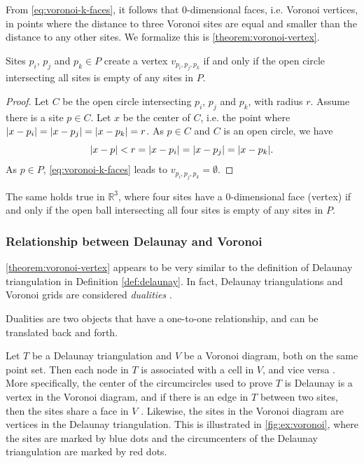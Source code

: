 From \autoref{eq:voronoi-k-faces}, it follows that 0-dimensional faces, i.e. Voronoi vertices, in points where the distance to three Voronoi sites are equal and smaller than the distance to any other sites. We formalize this is \autoref{theorem:voronoi-vertex}.

\begin{theorem}
\label{theorem:voronoi-vertex}
Sites $p_i$, $p_j$ and $p_k \in P$ create a vertex $v_{p_i, p_j, p_k}$ if and only if the open circle intersecting all sites is empty of any sites in $P$. 
\end{theorem}
\begin{proof}
Let $C$ be the open circle intersecting $p_i$, $p_j$ and $p_k$, with radius $r$. Assume there is a site $p \in C$. Let $x$ be the center of $C$, i.e. the point where $\lvert x - p_i\rvert = \lvert x - p_j\rvert = \lvert x - p_k\rvert = r$. As $p \in C$ and $C$ is an open circle, we have
\begin{equation*}
    \lvert x - p\rvert < r = \lvert x - p_i\rvert = \lvert x - p_j\rvert = \lvert x - p_k\rvert.
\end{equation*}
As $p \in P$, \autoref{eq:voronoi-k-faces} leads to $v_{p_i, p_j, p_k} = \emptyset$.
\end{proof}
The same holds true in $\mathbb{R}^3$, where four sites have a 0-dimensional face (vertex) if and only if the open ball intersecting all four sites is empty of any sites in $P$.

\subsubsection{Relationship between Delaunay and Voronoi}
\autoref{theorem:voronoi-vertex} appears to be very similar to the definition of Delaunay triangulation in Definition \ref{def:delaunay}. In fact, Delaunay triangulations and Voronoi grids are considered \emph{dualities} \cite{UPR_chapter}.

\begin{definition}[Dualities]
Dualities are two objects that have a one-to-one relationship, and can be translated back and forth.
\end{definition}

Let $T$ be a Delaunay triangulation and $V$ be a Voronoi diagram, both on the same point set. Then each node in $T$ is associated with a cell in $V$, and vice versa \cite{UPR_chapter}. More specifically, the center of the circumcircles used to prove $T$ is Delaunay is a vertex in the Voronoi diagram, and if there is an edge in $T$ between two sites, then the sites share a face in $V$ \cite{UPR_chapter}. Likewise, the sites in the Voronoi diagram are vertices in the Delaunay triangulation. This is illustrated in \autoref{fig:ex:voronoi}, where the sites are marked by blue dots and the circumcenters of the Delaunay triangulation are marked by red dots.


